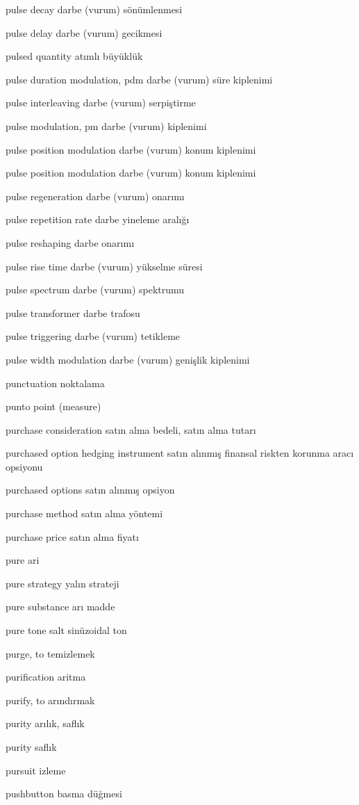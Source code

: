 \documentclass[12pt,fleqn]{article}\usepackage{../../common}
\begin{document}
pulse decay darbe (vurum) sönümlenmesi

pulse delay darbe (vurum) gecikmesi

pulsed quantity atımlı büyüklük

pulse duration modulation, pdm darbe (vurum) süre kiplenimi

pulse interleaving darbe (vurum) serpiştirme

pulse modulation, pm darbe (vurum) kiplenimi

pulse position modulation darbe (vurum) konum kiplenimi

pulse position modulation darbe (vurum) konum kiplenimi

pulse regeneration darbe (vurum) onarımı

pulse repetition rate darbe yineleme aralığı

pulse reshaping darbe onarımı

pulse rise time darbe (vurum) yükselme süresi

pulse spectrum darbe (vurum) spektrumu

pulse transformer darbe trafosu

pulse triggering darbe (vurum) tetikleme

pulse width modulation darbe (vurum) genişlik kiplenimi

punctuation noktalama

punto point (measure)

purchase consideration satın alma bedeli, satın alma tutarı

purchased option hedging instrument satın alınmış finansal riskten korunma aracı opsiyonu

purchased options satın alınmış opsiyon

purchase method satın alma yöntemi

purchase price satın alma fiyatı

pure ari

pure strategy yalın strateji

pure substance arı madde

pure tone salt sinüzoidal ton

purge, to temizlemek

purification aritma

purify, to arındırmak

purity arılık, saflık

purity saflık

pursuit izleme

pushbutton basma düğmesi
\end{document}
